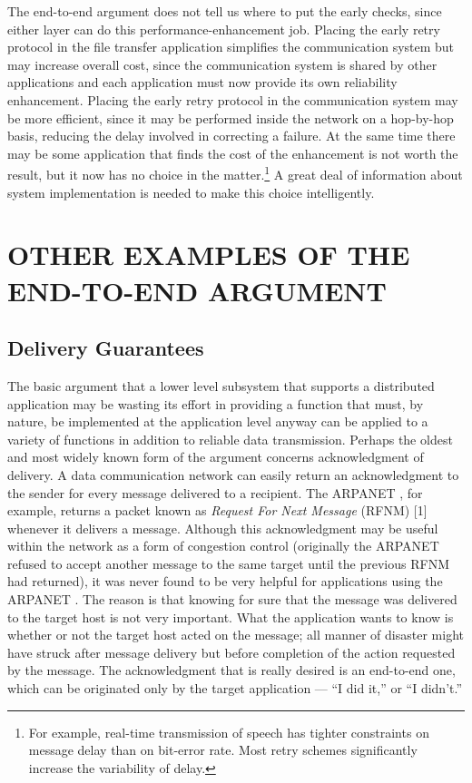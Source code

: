 \documentclass[a4paper,11pt,notitlepage,twoside,openright]{article}
\begin{document}
The end-to-end argument does not tell us where to put the early checks,
since either layer can do this performance-enhancement job. Placing the
early retry protocol in the file transfer application simplifies the
communication system but may increase overall cost, since the
communication system is shared by other applications and each
application must now provide its own reliability enhancement. Placing
the early retry protocol in the communication system may be more
efficient, since it may be performed inside the network on a hop-by-hop
basis, reducing the delay involved in correcting a failure. At the same
time there may be some application that finds the cost of the
enhancement is not worth the result, but it now has no choice in the
matter.\footnote{For example, real-time transmission of speech has tighter constraints on message delay than on bit-error rate. Most retry schemes significantly increase the variability of delay.} A
great deal of information about system implementation is needed to make
this choice intelligently.


\hypertarget{other-examples-of-the-end-to-end-argument}{%
\section{OTHER EXAMPLES OF THE END-TO-END
ARGUMENT}\label{other-examples-of-the-end-to-end-argument}}

\hypertarget{delivery-guarantees}{%
\subsection{Delivery Guarantees}\label{delivery-guarantees}}


The basic argument that a lower level subsystem that supports a
distributed application may be wasting its effort in providing a
function that must, by nature, be implemented at the application level
anyway can be applied to a variety of functions in addition to reliable
data transmission. Perhaps the oldest and most widely known form of the
argument concerns acknowledgment of delivery. A data communication
network can easily return an acknowledgment to the sender for every
message delivered to a recipient. The ARPANET , for example,
returns a packet known as \emph{Request For Next Message} (RFNM) {[}1{]}
whenever it delivers a message. Although this acknowledgment may be
useful within the network as a form of congestion control (originally
the ARPANET refused to accept another message to the same target
until the previous RFNM had returned), it was never found to be very
helpful for applications using the ARPANET . The reason is that
knowing for sure that the message was delivered to the target host is
not very important. What the application wants to know is whether or
not the target host acted on the message; all manner of disaster might
have struck after message delivery but before completion of the action
requested by the message. The acknowledgment that is really desired is
an end-to-end one, which can be originated only by the target
application --- ``I did it,'' or ``I didn't.''
\end{document}
